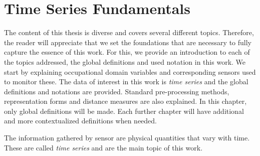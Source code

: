
%

\chapter{Time Series Fundamentals}
\label{cha:theory}

The content of this thesis is diverse and covers several different topics. Therefore, the reader will appreciate that we set the foundations that are necessary to fully capture the essence of this work. For this, we provide an introduction to each of the topics addressed, the global definitions and used notation in this work. We start by explaining occupational domain variables and corresponding sensors used to monitor these. The data of interest in this work is \textit{time series} and the global definitions and notations are provided. Standard pre-processing methods, representation forms and distance measures are also explained. In this chapter, only global definitions will be made. Each further chapter will have additional and more contextualized definitions when needed.


The information gathered by sensor are physical quantities that vary with time. These are called \textit{time series} and are the main topic of this work.

